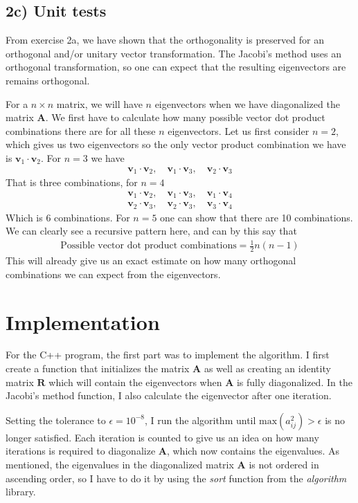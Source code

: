 \documentclass[12pt]{article}
\begin{document}
\subsection*{2c) Unit tests}
From exercise 2a, we have shown that the orthogonality is preserved for an orthogonal and/or unitary vector transformation. The Jacobi's method uses an orthogonal transformation, so one can expect that the resulting eigenvectors are remains orthogonal.

For a $n\times n$ matrix, we will have $n$ eigenvectors when we have diagonalized the matrix $\mathbf{A}$. We first have to calculate how many possible vector dot product combinations there are for all these $n$ eigenvectors. Let us first consider $n=2$, which gives us two eigenvectors so the only vector product combination we have is $\mathbf{v}_1 \cdot \mathbf{v}_2$. For $n = 3$ we have
\begin{align*}
\mathbf{v}_1 \cdot \mathbf{v}_2, \quad \mathbf{v}_1\cdot \mathbf{v}_3, \quad \mathbf{v}_2 \cdot \mathbf{v}_3
\end{align*}
That is three combinations, for $n=4$
\begin{align*}
\mathbf{v}_1 \cdot \mathbf{v}_2, \quad \mathbf{v}_1\cdot \mathbf{v}_3, \quad \mathbf{v}_1 \cdot \mathbf{v}_4\\
\mathbf{v}_2 \cdot \mathbf{v}_3, \quad \mathbf{v}_2 \cdot \mathbf{v}_3, \quad \mathbf{v}_3 \cdot \mathbf{v}_4
\end{align*}
Which is 6 combinations. For $n=5$ one can show that there are 10 combinations. We can clearly see a recursive pattern here, and can by this say that
\begin{align}
\text{Possible vector dot product combinations} = \frac{1}{2}n(n-1)
\end{align}
This will already give us an exact estimate on how many orthogonal combinations we can expect from the eigenvectors.
\section{Implementation}
For the C++ program, the first part was to implement the algorithm. I first create a function that initializes the matrix $\mathbf{A}$ as well as creating an identity matrix $\mathbf{R}$ which will contain the eigenvectors when $\mathbf{A}$ is fully diagonalized. In the Jacobi's method function, I also calculate the eigenvector after one iteration.

Setting the tolerance to $\epsilon = 10^{-8}$, I run the algorithm until $\text{max}(a_{ij}^2) > \epsilon$ is no longer satisfied. Each iteration is counted to give us an idea on how many iterations is required to diagonalize $\mathbf{A}$, which now contains the eigenvalues. As mentioned, the eigenvalues in the diagonalized matrix $\mathbf{A}$ is not ordered in ascending order, so I have to do it by using the \textit{sort} function from the \textit{algorithm} library.
\end{document}
